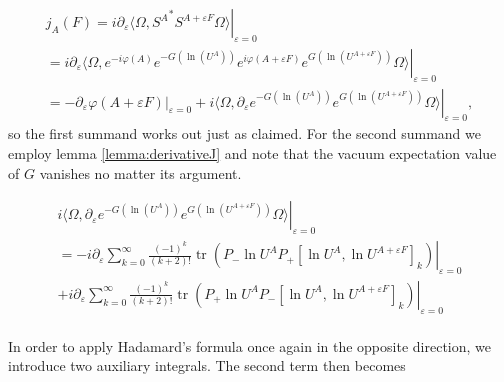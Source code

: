 \documentclass[b5paper,draft,openbib,12pt]{memoir}
\DeclareMathOperator{\tr}{tr}
\begin{document}
\begin{multline}\label{sleek_current_calc1}
j_A(F) = i \partial_{\varepsilon}\left. \langle \Omega, {S^{A} }^* S^{A+\varepsilon F}\Omega \rangle \right|_{\varepsilon=0}\\
=i \partial_{\varepsilon}\left. \langle \Omega, e^{-i\varphi(A)} e^{-G(\ln (U^A))} 
e^{i\varphi(A+\varepsilon F)}  e^{G(\ln (U^{A+\varepsilon F}))} \Omega\rangle \right|_{\varepsilon=0}\\
=- \partial_{\varepsilon} \left. \varphi(A+\varepsilon F) \right|_{\varepsilon=0}
+i\langle \Omega,\partial_{\varepsilon}\left.  e^{-G(\ln (U^A))} 
e^{G(\ln (U^{A+\varepsilon F}))} \Omega\rangle \right|_{\varepsilon=0},
\end{multline}
so the first summand works out just as claimed. For the second summand we employ lemma \ref{lemma:derivativeJ} and note that the vacuum expectation value of \(G\) vanishes no matter its argument.

\begin{multline}\label{sleek_current_calc3}
i\langle \Omega,\partial_{\varepsilon}\left.  e^{-G(\ln (U^A))} 
e^{G(\ln (U^{A+\varepsilon F}))} \Omega\rangle \right|_{\varepsilon=0}\\
=-i  \partial_{\varepsilon} \left.\sum_{k=0}^\infty \frac{(-1)^k}{(k+2)!} 
 \tr\left(P_- \ln U^A P_+[\ln U^A ,\ln U^{A+\varepsilon F} ]_{k}\right) \right|_{\varepsilon=0}\\
 +i  \partial_{\varepsilon} \left.\sum_{k=0}^\infty \frac{(-1)^k}{(k+2)!}  \tr\left(P_+ \ln U^A P_-[\ln U^A,\ln U^{A+\varepsilon F} ]_{k}\right) \right|_{\varepsilon=0}\\ 
\end{multline}

In order to apply Hadamard's formula once again in the opposite direction, we introduce two auxiliary integrals.
The second term then becomes
\end{document}
